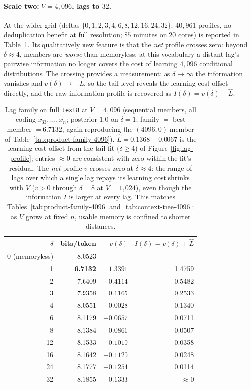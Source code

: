 \documentclass[11pt]{article}
\begin{document}
\paragraph{Scale two: $V=4{,}096$, lags to $32$.}
At the wider grid (deltas $\{0,1,2,3,4,6,8,12,16,24,32\}$; $40{,}961$
profiles, no deduplication benefit at full resolution; $85$ minutes on
20 cores) is reported in Table~\ref{tab:lag-family-4096}.  Its
qualitatively new feature is that the \emph{net} profile crosses zero:
beyond $\delta \approx 4$, members are \emph{worse} than memoryless:
at this vocabulary a distant lag's pairwise information no longer
covers the cost of learning $4{,}096$ conditional distributions.  The
crossing provides a measurement: as $\delta \to \infty$
the information vanishes and $v(\delta) \to -L$, so the tail level
reveals the learning-cost offset directly, and the raw information
profile is recovered as $I(\delta) = v(\delta) + \hat L$.

\begin{table}[ht]
\centering
\begin{tabular}{rrrr}
\toprule
$\delta$ & bits/token & $v(\delta)$ & $I(\delta) = v(\delta)+\hat L$ \\
\midrule
0 (memoryless) & 8.0523 & --- & --- \\
1  & \textbf{6.7132} & $1.3391$ & 1.4759 \\
2  & 7.6409 & $0.4114$ & 0.5482 \\
3  & 7.9358 & $0.1165$ & 0.2533 \\
4  & 8.0551 & $-0.0028$ & 0.1340 \\
6  & 8.1179 & $-0.0657$ & 0.0711 \\
8  & 8.1384 & $-0.0861$ & 0.0507 \\
12 & 8.1533 & $-0.1010$ & 0.0358 \\
16 & 8.1642 & $-0.1120$ & 0.0248 \\
24 & 8.1777 & $-0.1254$ & 0.0114 \\
32 & 8.1855 & $-0.1333$ & $\approx 0$ \\
\bottomrule
\end{tabular}
\caption{Lag family on full \texttt{text8} at $V=4{,}096$ (sequential
  members, all coding $x_{33},\dots,x_n$; posterior $1.0$ on
  $\delta=1$; family $=$ best member $= 6.7132$, again reproducing the
  $(4096,0)$ member of Table~\ref{tab:product-family-4096}).
  $\hat L = 0.1368 \pm 0.0067$ is the learning-cost offset from the
  tail fit ($\delta \ge 4$) of Figure~\ref{fig:lag-profile}; entries
  $\approx 0$ are consistent with zero within the fit's residual.  The
  \emph{net} profile $v$ crosses zero at $\delta \approx 4$: the range
  of lags over which a single lag repays its learning cost shrinks with
  $V$ ($v>0$ through $\delta = 8$ at $V=1{,}024$), even though the
  information $I$ is larger at every lag.  This matches
  Tables~\ref{tab:product-family-4096}
  and~\ref{tab:context-tree-4096}: as $V$ grows at fixed $n$, usable
  memory is confined to shorter distances.}
\label{tab:lag-family-4096}
\end{table}
\end{document}

